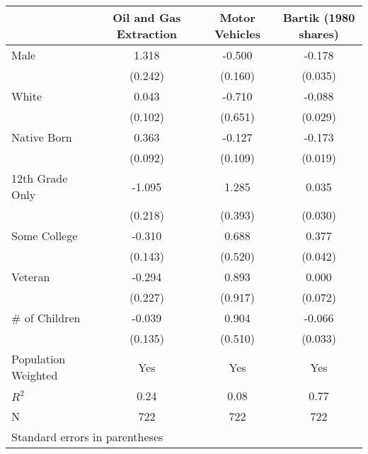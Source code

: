 \begin{tabular}{l*{3}{c}}
\toprule
                &\multicolumn{1}{c}{Oil and Gas Extraction}&\multicolumn{1}{c}{Motor Vehicles}&\multicolumn{1}{c}{Bartik (1980 shares)}\\
\midrule
Male            &    1.318&   -0.500&   -0.178\\
                &  (0.242)&  (0.160)&  (0.035)\\
White           &    0.043&   -0.710&   -0.088\\
                &  (0.102)&  (0.651)&  (0.029)\\
Native Born     &    0.363&   -0.127&   -0.173\\
                &  (0.092)&  (0.109)&  (0.019)\\
12th Grade Only &   -1.095&    1.285&    0.035\\
                &  (0.218)&  (0.393)&  (0.030)\\
Some College    &   -0.310&    0.688&    0.377\\
                &  (0.143)&  (0.520)&  (0.042)\\
Veteran         &   -0.294&    0.893&    0.000\\
                &  (0.227)&  (0.917)&  (0.072)\\
\# of Children  &   -0.039&    0.904&   -0.066\\
                &  (0.135)&  (0.510)&  (0.033)\\
\midrule
Population Weighted&      Yes&      Yes&      Yes\\
$ R^2$          &     0.24&     0.08&     0.77\\
N               &      722&      722&      722\\
\bottomrule
\multicolumn{4}{l}{\footnotesize Standard errors in parentheses}\\
\end{tabular}
